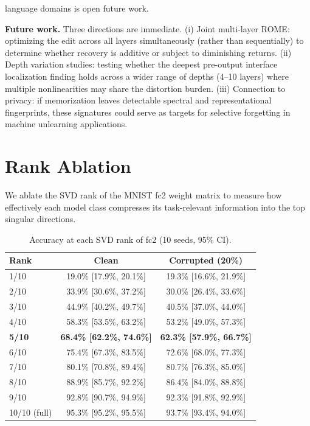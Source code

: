 \documentclass{article}
\begin{document}
language domains is open future work.

\textbf{Future work.} Three directions are immediate. (i) Joint multi-layer ROME: optimizing the edit across all layers simultaneously (rather than sequentially) to determine whether recovery is additive or subject to diminishing returns. (ii) Depth variation studies: testing whether the deepest pre-output interface localization finding holds across a wider range of depths (4--10 layers) where multiple nonlinearities may share the distortion burden. (iii) Connection to privacy: if memorization leaves detectable spectral and representational fingerprints, these signatures could serve as targets for selective forgetting in machine unlearning applications.




\appendix
\section{Rank Ablation}
\label{sec:rank_ablation}

We ablate the SVD rank of the MNIST fc2 weight matrix to measure how effectively each model class compresses its task-relevant information into the top singular directions.

\begin{table}[h]
  \centering
  \caption{Accuracy at each SVD rank of fc2 (10 seeds, 95\% CI).}
  \label{tab:rank_ablation}
  \begin{tabular}{lcc}
    \toprule
    Rank & Clean & Corrupted (20\%) \\
    \midrule
    1/10 & 19.0\% [17.9\%, 20.1\%] & 19.3\% [16.6\%, 21.9\%] \\
    2/10 & 33.9\% [30.6\%, 37.2\%] & 30.0\% [26.4\%, 33.6\%] \\
    3/10 & 44.9\% [40.2\%, 49.7\%] & 40.5\% [37.0\%, 44.0\%] \\
    4/10 & 58.3\% [53.5\%, 63.2\%] & 53.2\% [49.0\%, 57.3\%] \\
    \textbf{5/10} & \textbf{68.4\% [62.2\%, 74.6\%]} & \textbf{62.3\% [57.9\%, 66.7\%]} \\
    6/10 & 75.4\% [67.3\%, 83.5\%] & 72.6\% [68.0\%, 77.3\%] \\
    7/10 & 80.1\% [70.8\%, 89.4\%] & 80.7\% [76.3\%, 85.0\%] \\
    8/10 & 88.9\% [85.7\%, 92.2\%] & 86.4\% [84.0\%, 88.8\%] \\
    9/10 & 92.8\% [90.7\%, 94.9\%] & 92.3\% [91.8\%, 92.9\%] \\
    10/10 (full) & 95.3\% [95.2\%, 95.5\%] & 93.7\% [93.4\%, 94.0\%] \\
    \bottomrule
  \end{tabular}
\end{table}
\end{document}
